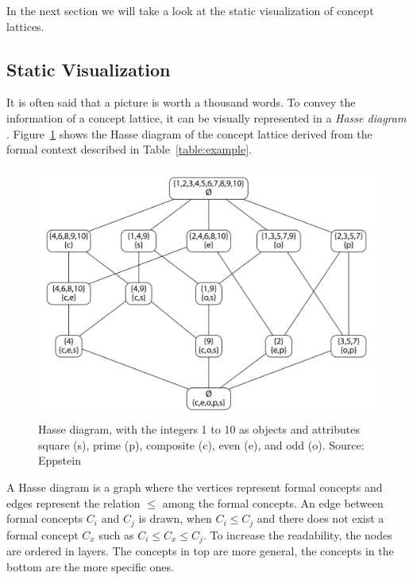 \documentclass[11pt]{report}
\begin{document}
In the next section we will take a look at the static visualization of concept lattices.

\subsection{Static Visualization}

It is often said that a picture is worth a thousand words. To convey the information of a concept lattice, it can be visually represented in a \textit{Hasse diagram} \cite{Ganter2012}. Figure~\ref{figure:example} shows the Hasse diagram of the concept lattice derived from the formal context described in Table~\ref{table:example}. \\

\begin{figure}[!ht]
	\centering
	\includegraphics[width=\linewidth]{./images/fcaExample}
\caption{Hasse diagram, with the integers 1 to 10 as objects and attributes square (s), prime (p), composite (c), even (e), and odd (o). Source: Eppstein \cite{fcaexample}}
\label{figure:example}
\end{figure}

A Hasse diagram is a graph where the vertices represent formal concepts and edges represent the relation $\le$ among the formal concepts. An edge between formal concepts $C_i$ and $C_j$ is drawn, when $C_i \le C_j$ and there does not exist a formal concept $C_x$ such as $C_i \le C_x \le C_j$. To increase the readability, the nodes are ordered in layers. The concepts in top are more general, the concepts in the bottom are the more specific ones.\\
\end{document}
